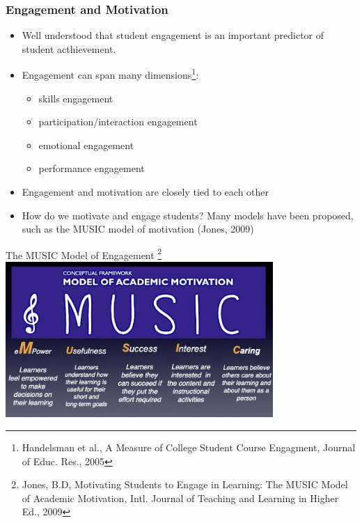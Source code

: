 \documentclass[aspectratio=169]{beamer}
\begin{document}
\begin{frame}
	\frametitle{Engagement and Motivation}
\begin{itemize} 
	\item Well understood that student engagement is an important
		predictor of student acthievement.
	\item Engagement can span many dimensions\footnote{Handelsman et al., 
	A Measure of College Student Course Engagment, Journal of Educ. Res., 2005}: 
		\begin{itemize}
			\item skills engagement
			\item participation/interaction engagement
			\item emotional engagement
			\item performance engagement
		\end{itemize}
	\item Engagement and motivation are closely tied to each other
	\item How do we motivate and engage students? 
		Many models have been proposed, such as 
		the MUSIC model of motivation  (Jones, 2009)
\end{itemize}
\end{frame}
\begin{frame}{The MUSIC Model of Engagement
\footnote{ Jones, B.D, Motivating Students to Engage in Learning: The MUSIC Model of Academic Motivation, Intl. Journal of Teaching and Learning in Higher Ed., 2009}}
\centering\includegraphics[width=4in]{figs/music_model.png}
\end{frame}
\end{document}
